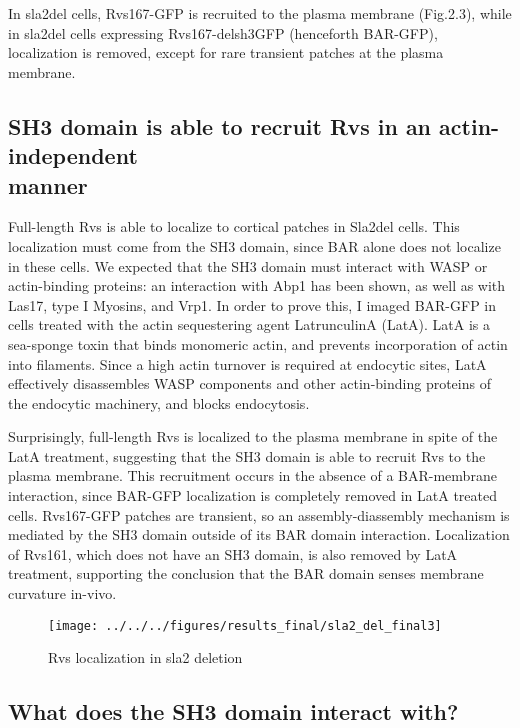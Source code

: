 	\vspace{5mm}
	In sla2del cells, Rvs167-GFP is recruited to the plasma membrane (Fig.2.3), while in sla2del cells expressing Rvs167-delsh3GFP (henceforth BAR-GFP), localization is removed, except for rare transient patches at the plasma membrane. 

	\subsection{SH3 domain is able to recruit Rvs in an
	actin-independent  	\\ manner}
	Full-length Rvs is able to localize to cortical patches in Sla2del cells. This localization must come from the SH3 domain, since BAR alone 	does not localize in these cells. We expected that the SH3 domain must interact with WASP or actin-binding proteins: an interaction with Abp1 has been shown, as well as with Las17, type I Myosins, and Vrp1. In order to prove this, I imaged BAR-GFP in cells treated with the actin sequestering agent LatrunculinA (LatA). LatA is a sea-sponge toxin that binds monomeric actin, and prevents incorporation of actin into filaments. Since a high actin turnover is required at endocytic sites, LatA effectively disassembles WASP components and other actin-binding proteins of the endocytic machinery, and blocks endocytosis. 

	\vspace{5mm}
	Surprisingly, full-length Rvs is localized to the plasma membrane in spite of the LatA treatment, suggesting that the SH3 domain is able to recruit Rvs to the plasma membrane. This recruitment occurs in the absence of a BAR-membrane interaction, since BAR-GFP localization is completely removed in LatA treated cells. Rvs167-GFP patches are transient, so an assembly-diassembly mechanism is mediated by the SH3 domain outside of its BAR domain interaction. Localization of Rvs161, which does not have an SH3 domain, is also removed by LatA treatment, supporting the conclusion that the BAR domain senses membrane curvature in-vivo. 

\begin{figure}
	\centering
\texttt{[image: ../../../figures/results\_final/sla2\_del\_final3]}
	\caption{Rvs localization in sla2 deletion\label{fig2_sla2del}}
\end{figure}

	\subsection{What does the SH3 domain interact with?}
